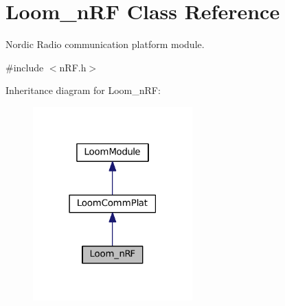 \hypertarget{class_loom__n_r_f}{}\section{Loom\+\_\+n\+RF Class Reference}
\label{class_loom__n_r_f}


Nordic Radio communication platform module.  




{\ttfamily \#include $<$n\+R\+F.\+h$>$}



Inheritance diagram for Loom\+\_\+n\+RF\+:\nopagebreak
\begin{figure}[H]
\begin{center}
\leavevmode
\includegraphics[width=174pt]{class_loom__n_r_f__inherit__graph}
\end{center}
\end{figure}
